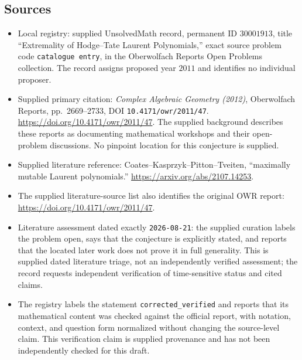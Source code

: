 \documentclass[11pt]{article}
\begin{document}
\subsection{Sources}
\begin{itemize}
\item Local registry: supplied UnsolvedMath record, permanent ID \(30001913\), title ``Extremality of Hodge--Tate Laurent Polynomials,'' exact source problem code \texttt{catalogue entry}, in the Oberwolfach Reports Open Problems collection. The record assigns proposed year \(2011\) and identifies no individual proposer.
\item Supplied primary citation: \emph{Complex Algebraic Geometry (2012)}, Oberwolfach Reports, pp.~2669--2733, DOI \texttt{10.4171/owr/2011/47}. \url{https://doi.org/10.4171/owr/2011/47}. The supplied background describes these reports as documenting mathematical workshops and their open-problem discussions. No pinpoint location for this conjecture is supplied.
\item Supplied literature reference: Coates--Kasprzyk--Pitton--Tveiten, ``maximally mutable Laurent polynomials.'' \url{https://arxiv.org/abs/2107.14253}.
\item The supplied literature-source list also identifies the original OWR report: \url{https://doi.org/10.4171/owr/2011/47}.
\item Literature assessment dated exactly \texttt{2026-08-21}: the supplied curation labels the problem open, says that the conjecture is explicitly stated, and reports that the located later work does not prove it in full generality. This is supplied dated literature triage, not an independently verified assessment; the record requests independent verification of time-sensitive status and cited claims.
\item The registry labels the statement \texttt{corrected\_verified} and reports that its mathematical content was checked against the official report, with notation, context, and question form normalized without changing the source-level claim. This verification claim is supplied provenance and has not been independently checked for this draft.
\end{itemize}
\end{document}
